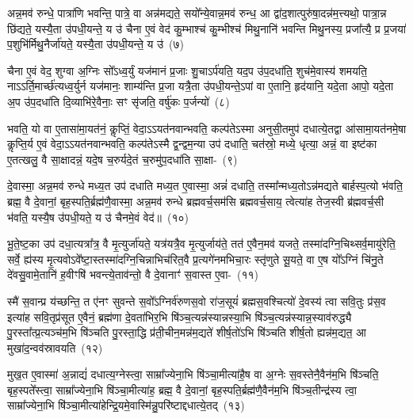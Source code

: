 अन्न॒मव॑ रुन्धे॒ पात्रा॑णि भवन्ति॒ पात्रे॒ वा अन्न॑मद्यते॒ सयो᳚न्ये॒वान्न॒मव॑ रुन्ध॒ आ द्वा॑द॒शात्पुरु॑षा॒दन्न॑म॒त्त्यथो॒ पात्रा॒न्न छि॑द्यते॒ यस्यै॒ता उ॑पधी॒यन्ते॒ य उ॑ चैना ए॒वं वेद॑ कु॒म्भाश्च॑ कु॒म्भीश्च॑ मिथु॒नानि॑ भवन्ति मिथु॒नस्य॒ प्रजा᳚त्यै॒ प्र प्र॒जया॑ प॒शुभि॑र्मिथु॒नैर्जा॑यते॒ यस्यै॒ता उ॑पधी॒यन्ते॒ य उ॑~(७)\ip

चैना ए॒वं वेद॒ शुग्वा अ॒ग्निः सो᳚\-ऽध्व॒र्युं यज॑मानं प्र॒जाः शु॒चा\-ऽर्प॑यति॒ यद॒प उ॑प॒\-दधा॑ति॒ शुच॑मे॒वास्य॑ शमयति॒ नाऽऽर्ति॒मार्च्छ॑त्यध्व॒र्युर्न यज॑मानः॒ शाम्य॑न्ति प्र॒जा यत्रै॒ता उ॑पधी॒यन्ते॒\-ऽपां वा ए॒तानि॒ हृद॑यानि॒ यदे॒ता आपो॒ यदे॒ता अ॒प उ॑प॒\-दधा॑ति दि॒व्याभि॑रे॒वैनाः॒ सꣳ सृ॑जति॒ वर्\mbox{}षु॑कः प॒र्जन्यो॑~(८)\ip

भवति॒ यो वा ए॒तासा॑मा॒यत॑नं॒ कॢप्तिं॒ वेदा॒\-ऽऽ\-यत॑नवान्भवति॒ कल्प॑ते\-ऽस्मा अनुसी॒तमुप॑ दधात्ये॒तद्वा आ॑सामा॒यत॑नमे॒षा कॢप्ति॒र्य ए॒वं वेदा॒\-ऽऽ\-यत॑नवान्भवति॒ कल्प॑ते\-ऽस्मै द्व॒न्द्वम॒न्या उप॑ दधाति॒ चत॑स्रो॒ मध्ये॒ धृत्या॒ अन्नं॒ वा इष्ट॑का ए॒तत्खलु॒ वै सा॒क्षादन्नं॒ यदे॒ष च॒रुर्यदे॒तं च॒रुमु॑प॒\-दधा॑ति सा॒क्षा-~(९)\ip

दे॒वास्मा॒ अन्न॒मव॑ रुन्धे मध्य॒त उप॑ दधाति मध्य॒त ए॒वास्मा॒ अन्नं॑ दधाति॒ तस्मा᳚न्मध्य॒तो\-ऽन्न॑मद्यते बार्\mbox{}हस्प॒त्यो भ॑वति॒ ब्रह्म॒ वै दे॒वानां॒ बृह॒स्पति॒र्ब्रह्म॑णै॒वास्मा॒ अन्न॒मव॑ रुन्धे ब्रह्मवर्च॒सम॑सि ब्रह्मवर्च॒साय॒ त्वेत्या॑ह तेज॒स्वी ब्र॑ह्मवर्च॒सी भ॑वति॒ यस्यै॒ष उ॑पधी॒यते॒ य उ॑ चैनमे॒वं वेद॑॥~(१०)\ip

{\anuvakamend[{अ॒मृत॑मस्मै जायते॒ यस्यै॒ता उ॑पधी॒यन्ते॒ य उ॑ प॒र्जन्य॑ उप॒\-दधा॑ति सा॒क्षाथ्स॒प्तच॑त्वारिꣳशच्च}]}

भू॒ते॒ष्ट॒का उप॑ दधा॒त्यत्रा᳚त्र॒ वै मृ॒त्युर्जा॑यते॒ यत्र॑यत्रै॒व मृ॒त्युर्जाय॑ते॒ तत॑ ए॒वैन॒मव॑ यजते॒ तस्मा॑दग्नि॒चिथ्सर्व॒मायु॑रेति॒ सर्वे॒ ह्य॑स्य मृ॒त्यवो\-ऽवे᳚ष्टा॒स्तस्मा॑दग्नि॒चिन्नाभिच॑रित॒वै प्र॒त्यगे॑नमभिचा॒रः स्तृ॑णुते सू॒यते॒ वा ए॒ष यो᳚\-ऽग्निं चि॑नु॒ते दे॑वसु॒वामे॒तानि॑ ह॒वीꣳषि॑ भवन्त्ये॒ताव॑न्तो॒ वै दे॒वानाꣳ॑ स॒वास्त ए॒वा-~(११)\ip

स्मै॑ स॒वान्प्र य॑च्छन्ति॒ त ए॑नꣳ सुवन्ते स॒वो᳚\-ऽग्निर्व॑रुणस॒वो रा॑ज॒सूयं॑ ब्रह्मस॒वश्चित्यो॑ दे॒वस्य॑ त्वा सवि॒तुः प्र॑स॒व इत्या॑ह सवि॒तृप्र॑सूत ए॒वैनं॒ ब्रह्म॑णा दे॒वता॑भिर॒भि षि॑ञ्च॒त्यन्न॑स्यान्नस्या॒भि षि॑ञ्च॒त्यन्न॑स्यान्न॒स्याव॑रुद्ध्यै पु॒रस्ता᳚त्प्र॒त्यञ्च॑म॒भि षि॑ञ्चति पु॒रस्ता॒द्धि प्र॑ती॒चीन॒मन्न॑म॒द्यते॑ शीर्\mbox{}ष॒तो॑\-ऽभि षि॑ञ्चति शीर्\mbox{}ष॒तो ह्यन्न॑म॒द्यत॒ आ मुखा॑द॒न्वव॑स्रावयति~(१२)\ip

मुख॒त ए॒वास्मा॑ अ॒न्नाद्यं॑ दधात्य॒ग्नेस्त्वा॒ साम्रा᳚ज्येना॒भि षि॑ञ्चा॒मीत्या॑है॒ष वा अ॒ग्नेः स॒वस्तेनै॒वैन॑म॒भि षि॑ञ्चति॒ बृह॒स्पते᳚स्त्वा॒ साम्रा᳚ज्येना॒भि षि॑ञ्चा॒मीत्या॑ह॒ ब्रह्म॒ वै दे॒वानां॒ बृह॒स्पति॒र्ब्रह्म॑णै॒वैन॑म॒भि षि॑ञ्च॒तीन्द्र॑स्य त्वा॒ साम्रा᳚ज्येना॒भि षि॑ञ्चा॒मीत्या॑हेन्द्रि॒यमे॒वा\-स्मि॑न्नु॒प\-रि॑ष्टाद्दधात्ये॒तद्~(१३)\ip

